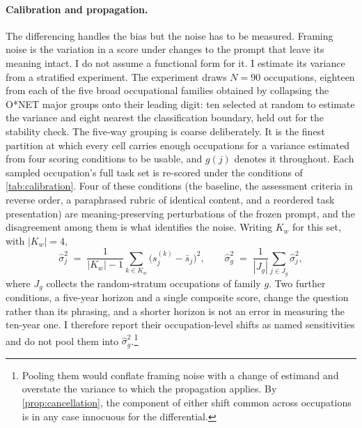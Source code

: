 \paragraph{Calibration and propagation.} The differencing handles the bias but the noise has to be measured. Framing noise is the variation in a score under changes to the prompt that leave its meaning intact. I do not assume a functional form for it. I estimate its variance from a stratified experiment. The experiment draws $N=90$ occupations, eighteen from each of the five broad occupational families obtained by collapsing the O*NET major groups onto their leading digit: ten selected at random to estimate the variance and eight nearest the classification boundary, held out for the stability check. The five-way grouping is coarse deliberately. It is the finest partition at which every cell carries enough occupations for a variance estimated from four scoring conditions to be usable, and $g(j)$ denotes it throughout.
Each sampled occupation's full task set is re-scored under the conditions of \cref{tab:calibration}. Four of these conditions (the baseline, the assessment criteria in reverse order, a paraphrased rubric of identical content, and a reordered task presentation) are meaning-preserving perturbations of the frozen prompt, and the disagreement among them is what identifies the noise. Writing $K_w$ for this set, with $|K_w| = 4$,
\begin{equation}\label{eq:variance}
\widehat{\sigma}^2_j \;=\;
\frac{1}{|K_w| - 1} \sum_{k \in K_w}
\bigl(s^{(k)}_j - \bar{s}_j\bigr)^2,
\qquad
\widehat{\sigma}^2_g \;=\;
\frac{1}{|J_g|} \sum_{j \in J_g} \widehat{\sigma}^2_j ,
\end{equation}
where $J_g$ collects the random-stratum occupations of family $g$. Two further conditions, a five-year horizon and a single composite score, change the question rather than its phrasing, and a shorter horizon is not an error in measuring the ten-year one. I therefore report their occupation-level shifts as named sensitivities and do not pool them into $\widehat{\sigma}^2_g$.\footnote{Pooling them would conflate framing noise with a change of estimand and overstate the variance to which the propagation applies. By \cref{prop:cancellation}, the component of either shift common across occupations is in any case innocuous for the differential.}


